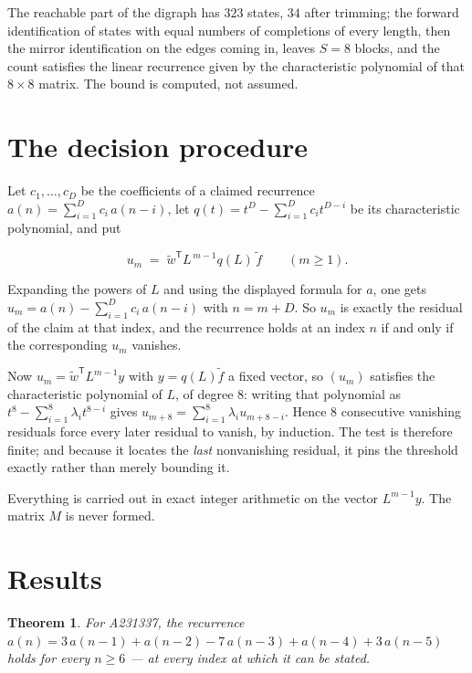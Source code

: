 \documentclass[11pt]{article}
\newtheorem{theorem}{Theorem}
\theoremstyle{definition}
\begin{document}
The reachable part of the digraph has $323$ states, $34$ after trimming; the forward identification of states with equal numbers of completions of every length, then the mirror identification on the edges coming in, leaves $S = 8$ blocks, and the count satisfies the linear recurrence given by the characteristic polynomial of that $8\times8$ matrix. The bound is computed, not assumed.

\section{The decision procedure}

Let $c_1,\dots,c_D$ be the coefficients of a claimed recurrence $a(n) = \sum_{i=1}^{D} c_i\,a(n-i)$, let $q(t) = t^{D} - \sum_{i=1}^{D} c_i t^{D-i}$ be its characteristic polynomial, and put

\[u_m \;=\; \tilde w^{\mathsf T} L^{\,m-1} q(L)\,\tilde f \qquad (m \ge 1).\]

Expanding the powers of $L$ and using the displayed formula for $a$, one gets $u_m = a(n) - \sum_{i=1}^{D} c_i\,a(n-i)$ with $n = m + D$. So $u_m$ is exactly the residual of the claim at that index, and the recurrence holds at an index $n$ if and only if the corresponding $u_m$ vanishes.

Now $u_m = \tilde w^{\mathsf T} L^{m-1} y$ with $y = q(L)\tilde f$ a fixed vector, so $(u_m)$ satisfies the characteristic polynomial of $L$, of degree $8$: writing that polynomial as $t^{8} - \sum_{i=1}^{8} \lambda_i t^{8-i}$ gives $u_{m+8} = \sum_{i=1}^{8} \lambda_i u_{m+8-i}$. Hence $8$ consecutive vanishing residuals force every later residual to vanish, by induction. The test is therefore finite; and because it locates the {\itshape last} nonvanishing residual, it pins the threshold exactly rather than merely bounding it.

Everything is carried out in exact integer arithmetic on the vector $L^{m-1}y$. The matrix $M$ is never formed.

\section{Results}

\begin{theorem} For A231337, the recurrence $a(n) = 3\,a(n-1) + a(n-2) - 7\,a(n-3) + a(n-4) + 3\,a(n-5)$ holds for every $n \ge 6$ --- at every index at which it can be stated.\end{theorem}
\end{document}
